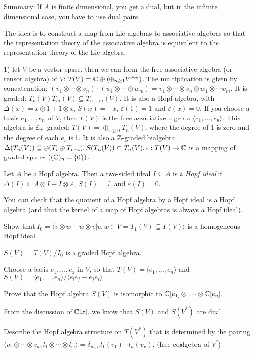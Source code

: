  Summary: If $A$ is finite dimensional, you get a dual, but in the infinite
 dimensional case, you have to use dual pairs.

  

 The idea is to construct a map from Lie algebras to associative algebras so that the
 representation theory of the associative algebra is equivalent to the representation
 theory of the Lie algebra.

  1) let $V$ be a vector space, then we can form the free associative algebra (or
 tensor algebra) of $V$: $T(V) = \mathbb{C}\oplus (\oplus_{n\ge 1} V^{\otimes n})$. The
 multiplication is given by concatenation: $(v_1\otimes\cdots\otimes v_n)\cdot
 (w_1\otimes\cdots\otimes w_m) = v_1\otimes\cdots\otimes v_n\otimes w_1\otimes\cdots
 w_m$. It is graded: $T_n(V)T_m(V)\subseteq T_{n+m}(V)$. It is also a Hopf algebra,
 with $\Delta(x)=x\otimes 1+1\otimes x$, $S(x)=-x$, $\varepsilon(1)=1$ and
 $\varepsilon(x)=0$. If you choose a basis $e_1,\dots, e_n$ of $V$, then $T(V)$ is the
 free associative algebra $\langle e_1,\dots, e_n\rangle$. This algebra is
 $\mathbb{Z}_+$-graded: $T(V) = \oplus_{n\ge 0} T_n(V)$, where the degree of 1 is zero and the
 degree of each $e_i$ is 1. It is also a $\mathbb{Z}$-graded bialgebra:
 $\Delta(T_n(V))\subseteq \oplus (T_i\oplus T_{n-i}), S(T_n(V))\subset T_n(V),
 \varepsilon : T(V)\rightarrow \mathbb{C}$ is a mapping of graded spaces $((\mathbb{C})_n=\{0\})$.
 \begin{definition}
   Let $A$ be a Hopf algebra. Then a two-sided ideal $I\subseteq A$ is a \emph{Hopf
   ideal} if $\Delta(I)\subseteq A\otimes I + I\otimes A$, $S(I)=I$,
   and $\varepsilon(I)=0$.
 \end{definition}
 You can check that the quotient of a Hopf algebra by a Hopf ideal is a Hopf algebra
 (and that the kernel of a map of Hopf algebras is always a Hopf ideal).

 \begin{exercise}
   Show that $I_0 = \langle v\otimes w-w\otimes v| v,w\in V=T_1(V)\subseteq T(V)\rangle$
   is a homogeneous Hopf ideal.
 \end{exercise}
 \begin{corollary}
   $S(V) = T(V)/I_0$ is a graded Hopf algebra.
 \end{corollary}
  Choose a basis $e_1,\dots, e_n$ in $V$, so that $T(V)=\langle e_1,\dots, e_n\rangle$
  and $S(V) = \langle e_1,\dots, e_n\rangle/\langle e_ie_j-e_je_i\rangle$
  \begin{exercise}
    Prove that the Hopf algebra $S(V)$ is isomorphic to $\mathbb{C}[e_1]\otimes\cdots\otimes
    \mathbb{C}[e_n]$.
  \end{exercise}
  \begin{remark}
    From the discussion of $\mathbb{C}[x]$, we know that $S(V)$ and $S(V^*)$ are dual.
  \end{remark}
  \begin{exercise}
    Describe the Hopf algebra structure on $T(V^*)$ that is determined by the
    pairing $\langle v_1\otimes \cdots\otimes v_n, l_1\otimes \cdots\otimes l_m\rangle
    = \delta_{m,n} l_1(v_1)\cdots l_n(v_n)$. (free coalgebra of $V^*$)
  \end{exercise}

